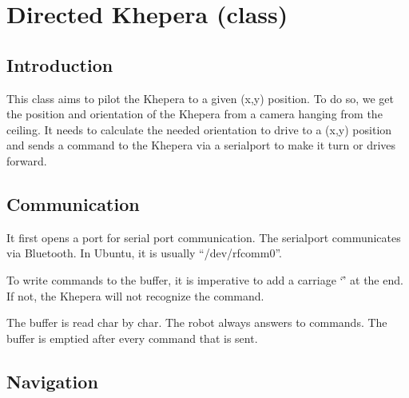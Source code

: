\section{Directed Khepera (class)}

\subsection{Introduction}

This class aims to pilot the Khepera to a given (x,y) position. To do 
so, we get the position and orientation of the Khepera from a camera 
hanging from the ceiling. It needs to calculate the needed orientation 
to drive to a (x,y) position and sends a command to the Khepera via a 
serialport to make it turn or drives forward.

\subsection{Communication}

It first opens a port for serial port communication. The serialport 
communicates via Bluetooth. In Ubuntu, it is usually “/dev/rfcomm0”.

To write commands to the buffer, it is imperative to add a carriage ‘\r’ 
at the end. If not, the Khepera will not recognize the command. 

The buffer is read char by char. The robot always answers to commands. 
The buffer is emptied after every command that is sent.

\subsection{Navigation}

 
